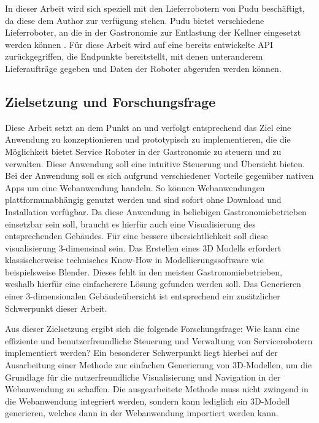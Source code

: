 In dieser Arbeit wird sich speziell mit den Lieferrobotern von Pudu beschäftigt, da diese dem Author zur verfügung stehen. Pudu bietet verschiedene Lieferroboter, an die in der Gastronomie zur Entlastung der Kellner eingesetzt werden können \cite{Sebotics2023}. Für diese Arbeit wird auf eine bereits entwickelte API zurückgegriffen, die Endpunkte bereitstellt, mit denen unteranderem Lieferaufträge gegeben und Daten der Roboter abgerufen werden können.


\subsection{Zielsetzung und Forschungsfrage}
Diese Arbeit setzt an dem Punkt an und verfolgt entsprechend das Ziel eine Anwendung zu konzeptionieren und prototypisch zu implementieren, die die Möglichkeit bietet Service Roboter in der Gastronomie zu steuern und zu verwalten. Diese Anwendung soll eine intuitive Steuerung und Übersicht bieten. Bei der Anwendung soll es sich aufgrund verschiedener Vorteile gegenüber nativen Apps um eine Webanwendung handeln. So können Webanwendungen plattformunabhängig genutzt werden und sind sofort ohne Download und Installation verfügbar. Da diese Anwendung in beliebigen Gastronomiebetrieben einsetzbar sein soll, braucht es hierfür auch eine Visualisierung des entsprechenden Gebäudes. Für eine bessere übersichtlichkeit soll diese visualisierung 3-dimensinal sein. Das Erstellen eines 3D Modells erfordert klassischerweise technisches Know-How in Modellierungssoftware wie beispielsweise Blender. Dieses fehlt in den meisten Gastronomiebetrieben, weshalb hierfür eine einfacherere Lösung gefunden werden soll. Das Generieren einer 3-dimensionalen Gebäudeübersicht ist entsprechend ein zusätzlicher Schwerpunkt dieser Arbeit.

Aus dieser Zielsetzung ergibt sich die folgende Forschungsfrage: Wie kann eine effiziente und benutzerfreundliche Steuerung und Verwaltung von Servicerobotern implementiert werden? Ein besonderer Schwerpunkt liegt hierbei auf der Ausarbeitung einer Methode zur einfachen Generierung von 3D-Modellen, um die Grundlage für die nutzerfreundliche Visualisierung und Navigation in der Webanwendung zu schaffen. Die ausgearbeitete Methode muss nicht zwingend in die Webanwendung integriert werden, sondern kann lediglich ein 3D-Modell generieren, welches dann in der Webanwendung importiert werden kann.

